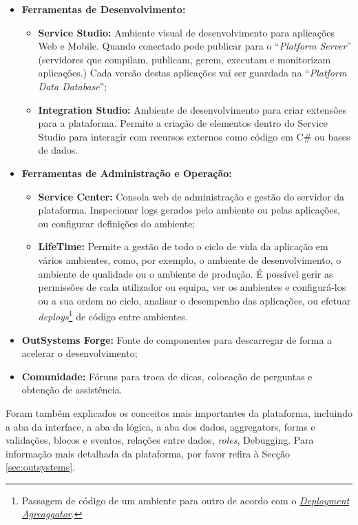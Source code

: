       \begin{itemize} 
        \item \textbf{Ferramentas de Desenvolvimento:}
          \begin{itemize}
            \item \textbf{Service Studio:} Ambiente visual de desenvolvimento para aplicações Web e Mobile. Quando conectado pode publicar para o ``\textit{Platform Server}'' (servidores que compilam, publicam, gerem, executam e monitorizam aplicações.) Cada versão destas aplicações vai ser guardada na ``\textit{Platform Data Database}'';
            \item \textbf{Integration Studio:} Ambiente de desenvolvimento para criar extensões para a plataforma. Permite a criação de elementos dentro do Service Studio para interagir com recursos externos como código em C\# ou bases de dados.
          \end{itemize}
        \item \textbf{Ferramentas de Administração e Operação:}
          \begin{itemize}
            \item \textbf{Service Center:} Consola web de administração e gestão do servidor da plataforma. Inspecionar logs gerados pelo ambiente ou pelas aplicações, ou configurar definições do ambiente;
            \item \textbf{LifeTime:} Permite a gestão de todo o ciclo de vida da aplicação em vários ambientes, como, por exemplo, o ambiente de desenvolvimento, o ambiente de qualidade ou o ambiente de produção. É possível gerir as permissões de cada utilizador ou equipa, ver os ambientes e configurá-los ou a sua ordem no ciclo, analisar o desempenho das aplicações, ou efetuar \textit{deploys}\footnote{Passagem de código de um ambiente para outro de acordo com o \hyperref[fig:deployment-aggregator]{\textit{Deployment Agreaggator}}.} de código entre ambientes.
          \end{itemize}
        \item \textbf{OutSystems Forge:} Fonte de componentes para descarregar de forma a acelerar o desenvolvimento;
        \item \textbf{Comunidade:} Fóruns para troca de dicas, colocação de perguntas e obtenção de assistência\cite{outsystems-components-and-tools}.
      \end{itemize}

      Foram também explicados os conceitos mais importantes da plataforma, incluindo a aba da interface, a aba da lógica, a aba dos dados, aggregators, forms e validações, blocos e eventos, relações entre dados, \textit{roles}, Debugging. Para informação mais detalhada da plataforma, por favor refira à Secção \ref{sec:outsystems}.
    
